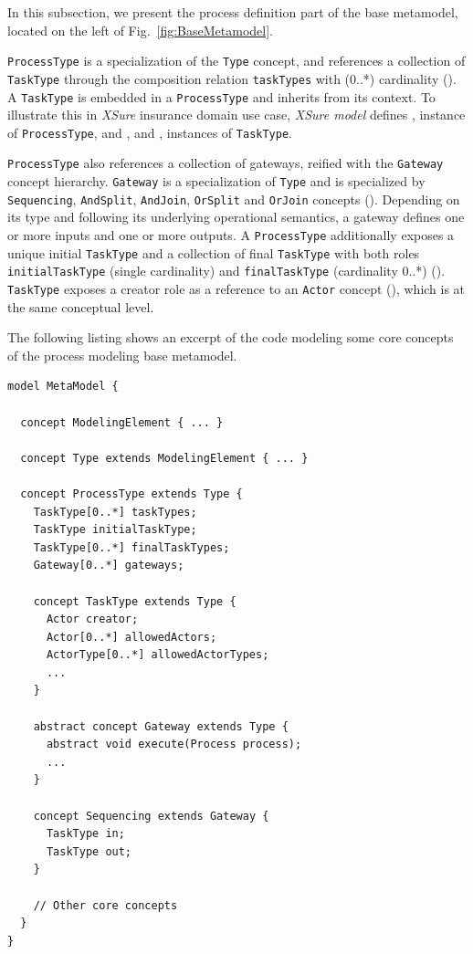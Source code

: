 In this subsection, we present the process definition part of the base
metamodel, located on the left of Fig.~\ref{fig:BaseMetamodel}.


\texttt{ProcessType} is a specialization of the \texttt{Type} concept, and
references a collection of \texttt{TaskType} through the composition relation
\texttt{taskTypes} with (0..*) cardinality (). A \texttt{TaskType}
is embedded in a \texttt{ProcessType} and inherits from its context. To
illustrate this in \textit{XSure} insurance domain use case, \textit{XSure
model} defines , instance of \texttt{ProcessType}, and
,  and , instances of
\texttt{TaskType}.

\texttt{ProcessType} also references a collection of gateways, reified with the
\texttt{Gateway} concept hierarchy. \texttt{Gateway} is a specialization of
\texttt{Type} and is specialized by \texttt{Sequencing}, \texttt{AndSplit},
\texttt{AndJoin}, \texttt{OrSplit} and \texttt{OrJoin} concepts ().
Depending on its type and following its underlying operational semantics, a
gateway defines one or more inputs and one or more outputs. A
\texttt{ProcessType} additionally exposes a unique initial \texttt{TaskType}
and a collection of final \texttt{TaskType} with both roles
\texttt{initialTaskType} (single cardinality) and \texttt{finalTaskType}
(cardinality 0..*) (). \texttt{TaskType} exposes a creator role as a
reference to an \texttt{Actor} concept (), which is at the same
conceptual level.

The following listing shows an excerpt of the \FML code modeling some core
concepts of the process modeling base metamodel.

\begin{lstlisting}
model MetaModel {

  concept ModelingElement { ... }

  concept Type extends ModelingElement { ... }

  concept ProcessType extends Type {
    TaskType[0..*] taskTypes;
    TaskType initialTaskType;
    TaskType[0..*] finalTaskTypes;
    Gateway[0..*] gateways;

    concept TaskType extends Type {
      Actor creator;
      Actor[0..*] allowedActors;
      ActorType[0..*] allowedActorTypes;
      ...
    }

    abstract concept Gateway extends Type {
      abstract void execute(Process process);
      ...
    }

    concept Sequencing extends Gateway {
      TaskType in;
      TaskType out;
    }

    // Other core concepts
  }
}
\end{lstlisting}

